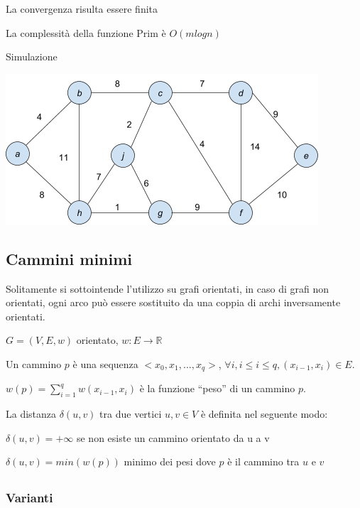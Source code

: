 \documentclass{article}
\begin{document}
{{{\protect\hypertarget{t.8fdb0455858db4c6dd05987cee7bc92788c770bd}{}{}\protect\hypertarget{t.44}{}{}



La convergenza risulta essere finita

La complessità della funzione Prim è $O(m logn)$

{Simulazione}

{\includegraphics{images/image542.png}}

\subsection{\texorpdfstring{{Cammini minimi}}{Cammini minimi}}\label{h.yl5v086nw9el}

{Solitamente si sottointende l'utilizzo su grafi orientati, in caso di grafi non orientati, ogni arco può essere sostituito da una coppia di archi inversamente orientati.}

$G=(V,E,w)$ orientato, $w:E\rightarrow \mathbb{R}$

Un cammino $p$ è una sequenza $<x_0,x_1,...,x_q>$, $\forall i, i\leq i \leq q, (x_{i-1},x_i) \in E$.

$w(p)=\sum_{i=1}^{q} w(x_{i-1},x_i)$ è la funzione ``peso'' di un cammino $p$.

{La distanza $\delta(u,v)$ tra due vertici $u,v \in V$ è definita nel seguente modo:}

{$\delta(u,v) = +\infty$ se non esiste un cammino orientato da u a v}

{$\delta(u,v)=min(w(p))$ minimo dei pesi dove $p$ è il cammino tra $u$ e $v$}

\subsection{\texorpdfstring{{}}{}}\label{h.h641h77p7srj}

\subsubsection{\texorpdfstring{{Varianti}}{Varianti}}\label{h.39wfvuocrt5u}

}}}
\end{document}
